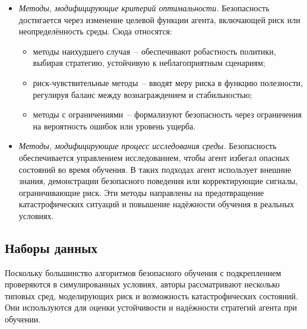 \begin{itemize}

    \item \emph{Методы, модифицирующие критерий оптимальности.}  
    Безопасность достигается через изменение целевой функции агента, включающей риск или неопределённость среды.  
    Сюда относятся:
    \begin{itemize}
        \item методы наихудшего случая~-- обеспечивают робастность политики, выбирая стратегию, устойчивую к неблагоприятным сценариям;
        \item риск-чувствительные методы~-- вводят меру риска в функцию полезности, регулируя баланс между вознаграждением и стабильностью;
        \item методы с ограничениями~-- формализуют безопасность через ограничения на вероятность ошибок или уровень ущерба.
    \end{itemize}

    \item \emph{Методы, модифицирующие процесс исследования среды.}  
    Безопасность обеспечивается управлением исследованием, чтобы агент избегал опасных состояний во время обучения.  
    В таких подходах агент использует внешние знания, демонстрации безопасного поведения или корректирующие сигналы, ограничивающие риск.  
    Эти методы направлены на предотвращение катастрофических ситуаций и повышение надёжности обучения в реальных условиях.

\end{itemize}


\subsection{Наборы данных}

Поскольку большинство алгоритмов безопасного обучения с подкреплением проверяются в симулированных условиях, авторы рассматривают несколько типовых сред, моделирующих риск и возможность катастрофических состояний.  
Они используются для оценки устойчивости и надёжности стратегий агента при обучении.

